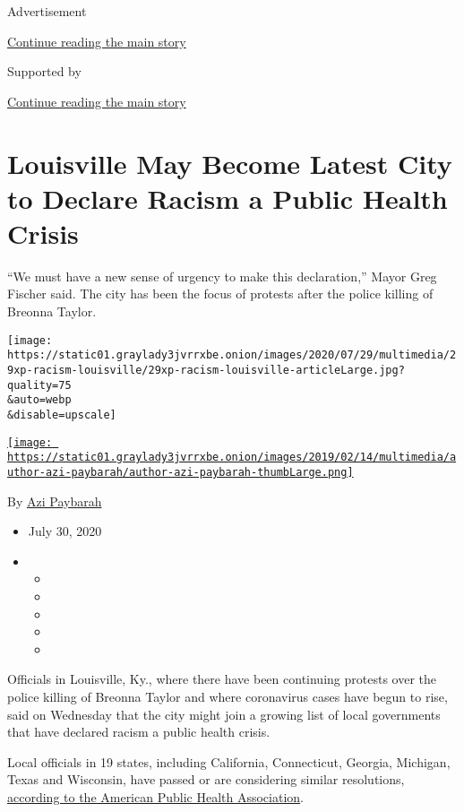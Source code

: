 Advertisement

\protect\hyperlink{after-top}{Continue reading the main story}

Supported by

\protect\hyperlink{after-sponsor}{Continue reading the main story}

\hypertarget{louisville-may-become-latest-city-to-declare-racism-a-public-health-crisis}{%
\section{Louisville May Become Latest City to Declare Racism a Public
Health
Crisis}\label{louisville-may-become-latest-city-to-declare-racism-a-public-health-crisis}}

``We must have a new sense of urgency to make this declaration,'' Mayor
Greg Fischer said. The city has been the focus of protests after the
police killing of Breonna Taylor.

\texttt{[image: https://static01.graylady3jvrrxbe.onion/images/2020/07/29/multimedia/29xp-racism-louisville/29xp-racism-louisville-articleLarge.jpg?quality=75\\\&auto=webp\\\&disable=upscale]}

\href{https://www.nytimes3xbfgragh.onion/by/azi-paybarah}{\texttt{[image: https://static01.graylady3jvrrxbe.onion/images/2019/02/14/multimedia/author-azi-paybarah/author-azi-paybarah-thumbLarge.png]}}

By \href{https://www.nytimes3xbfgragh.onion/by/azi-paybarah}{Azi
Paybarah}

\begin{itemize}
\item
  July 30, 2020
\item
  \begin{itemize}
  \item
  \item
  \item
  \item
  \item
  \end{itemize}
\end{itemize}

Officials in Louisville, Ky., where there have been continuing protests
over the police killing of Breonna Taylor and where coronavirus cases
have begun to rise, said on Wednesday that the city might join a growing
list of local governments that have declared racism a public health
crisis.

Local officials in 19 states, including California, Connecticut,
Georgia, Michigan, Texas and Wisconsin, have passed or are considering
similar resolutions,
\href{https://www.apha.org/topics-and-issues/health-equity/racism-and-health/racism-declarations}{according
to the American Public Health Association}.

